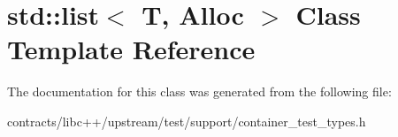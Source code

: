 \hypertarget{classstd_1_1list}{}\section{std\+:\+:list$<$ T, Alloc $>$ Class Template Reference}
\label{classstd_1_1list}


The documentation for this class was generated from the following file\+:\begin{DoxyCompactItemize}
\item 
contracts/libc++/upstream/test/support/container\+\_\+test\+\_\+types.\+h\end{DoxyCompactItemize}
